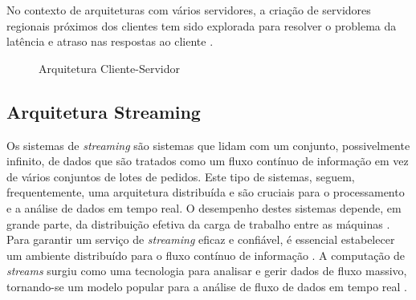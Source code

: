 No contexto de arquiteturas com vários servidores, a criação de servidores regionais próximos dos 
clientes tem sido explorada para resolver o problema da latência e atraso nas respostas ao cliente 
\cite{clientserver2022b}. 

\begin{figure}[H]
    \centering
    \qquad
    \caption{Arquitetura Cliente-Servidor}
    \label{fig:client-server}%
\end{figure}

\subsection{Arquitetura Streaming}

Os sistemas de \textit{streaming} são sistemas que lidam com um conjunto, possivelmente infinito, de
dados que são tratados como um fluxo contínuo de informação em vez de vários conjuntos de lotes de  
pedidos. Este tipo de sistemas, seguem, frequentemente, uma arquitetura distribuída e são cruciais 
para o processamento e a análise de dados em tempo real. O desempenho destes sistemas depende, 
em grande parte, da distribuição efetiva da carga de trabalho entre as máquinas \cite{stream2020}. 
Para garantir um serviço de \textit{streaming} eficaz e confiável, é essencial estabelecer um 
ambiente distribuído para o fluxo contínuo de informação \cite{stream2014}. A computação de 
\textit{streams} surgiu como uma tecnologia para analisar e gerir dados de fluxo massivo, 
tornando-se um modelo popular para a análise de fluxo de dados em tempo real 
\cite{stream2018} \cite{stream2018b}.

